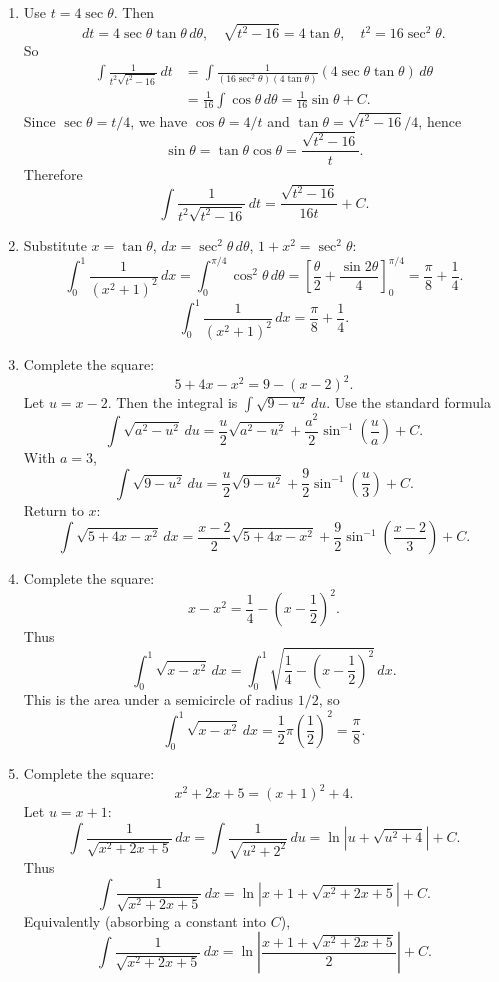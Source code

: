\documentclass[12pt]{article}
\begin{document}
\begin{enumerate}[label=(\alph*)]
\item Use \(t=4\sec\theta\). Then
\[
dt=4\sec\theta\tan\theta\,d\theta,\quad
\sqrt{t^{2}-16}=4\tan\theta,\quad
t^{2}=16\sec^{2}\theta.
\]
So
\begin{align*}
\int \frac{1}{t^{2}\sqrt{t^{2}-16}}\,dt
&=\int \frac{1}{(16\sec^{2}\theta)(4\tan\theta)}(4\sec\theta\tan\theta)\,d\theta\\
&=\frac{1}{16}\int \cos\theta\,d\theta
=\frac{1}{16}\sin\theta + C.
\end{align*}
Since \(\sec\theta=t/4\), we have \(\cos\theta=4/t\) and \(\tan\theta=\sqrt{t^{2}-16}/4\), hence
\[
\sin\theta=\tan\theta\cos\theta=\frac{\sqrt{t^{2}-16}}{t}.
\]
Therefore
\[
\boxed{\int \frac{1}{t^{2}\sqrt{t^{2}-16}}\,dt=\frac{\sqrt{t^{2}-16}}{16t}+C.}
\]

\item Substitute \(x=\tan\theta\), \(dx=\sec^{2}\theta\,d\theta\), \(1+x^{2}=\sec^{2}\theta\):
\[
\int_{0}^{1}\frac{1}{(x^{2}+1)^{2}}\,dx
=\int_{0}^{\pi/4}\cos^{2}\theta\,d\theta
=\left[\frac{\theta}{2}+\frac{\sin 2\theta}{4}\right]_{0}^{\pi/4}
=\frac{\pi}{8}+\frac{1}{4}.
\]
\[
\boxed{\int_{0}^{1}\frac{1}{(x^{2}+1)^{2}}\,dx=\frac{\pi}{8}+\frac{1}{4}.}
\]

\item Complete the square:
\[
5+4x-x^{2}=9-(x-2)^{2}.
\]
Let \(u=x-2\). Then the integral is \(\int \sqrt{9-u^{2}}\,du\). Use the standard formula
\[
\int \sqrt{a^{2}-u^{2}}\,du=\frac{u}{2}\sqrt{a^{2}-u^{2}}+\frac{a^{2}}{2}\sin^{-1}\!\left(\frac{u}{a}\right)+C.
\]
With \(a=3\),
\[
\int \sqrt{9-u^{2}}\,du=\frac{u}{2}\sqrt{9-u^{2}}+\frac{9}{2}\sin^{-1}\!\left(\frac{u}{3}\right)+C.
\]
Return to \(x\):
\[
\boxed{\int \sqrt{5+4x-x^{2}}\,dx
=\frac{x-2}{2}\sqrt{5+4x-x^{2}}+\frac{9}{2}\sin^{-1}\!\left(\frac{x-2}{3}\right)+C.}
\]

\item Complete the square:
\[
x-x^{2}=\frac{1}{4}-\left(x-\frac{1}{2}\right)^{2}.
\]
Thus
\[
\int_{0}^{1}\sqrt{x-x^{2}}\,dx
=\int_{0}^{1}\sqrt{\frac{1}{4}-\left(x-\frac{1}{2}\right)^{2}}\,dx.
\]
This is the area under a semicircle of radius \(1/2\), so
\[
\boxed{\int_{0}^{1}\sqrt{x-x^{2}}\,dx=\frac{1}{2}\pi\left(\frac{1}{2}\right)^{2}=\frac{\pi}{8}.}
\]

\item Complete the square:
\[
x^{2}+2x+5=(x+1)^{2}+4.
\]
Let \(u=x+1\):
\[
\int \frac{1}{\sqrt{x^{2}+2x+5}}\,dx
=\int \frac{1}{\sqrt{u^{2}+2^{2}}}\,du
=\ln\left|u+\sqrt{u^{2}+4}\right|+C.
\]
Thus
\[
\boxed{\int \frac{1}{\sqrt{x^{2}+2x+5}}\,dx
=\ln\left|x+1+\sqrt{x^{2}+2x+5}\right|+C.}
\]
Equivalently (absorbing a constant into \(C\)),
\[
\boxed{\int \frac{1}{\sqrt{x^{2}+2x+5}}\,dx
=\ln\left|\frac{x+1+\sqrt{x^{2}+2x+5}}{2}\right|+C.}
\]
\end{enumerate}
\end{document}
